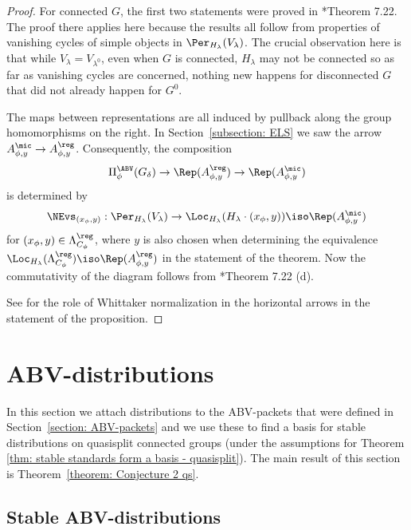 \documentclass[11pt,letterpaper]{amsart}
\numberwithin{equation}{section}
\begin{document}
\begin{proof}
    For connected $G$, the first two statements were proved in \cite{CFMMX22}*{Theorem 7.22}.
    The proof there applies here because the results all follow from properties of vanishing cycles of simple objects in $\Per_{H_\lambda}(V_\lambda)$.
    The crucial observation here is that while $V_{\lambda} = V_{\lambda^0}$, even when $G$ is connected, $H_\lambda$ may not be connected so as far as vanishing cycles are concerned, nothing new happens for disconnected $G$ that did not already happen for $G^0$. 
    
    The maps between representations are all induced by pullback along the group homomorphisms on the right. 
    In Section~\ref{subsection: ELS} we saw the arrow $A_{\phi,y}^\mic \to A_{\phi,y}^\reg$.
    Consequently, the composition 
\[
\Pi^\ABV_\phi(G_\delta) \to \Rep(A_{\phi,y}^\reg) \to \Rep(A_{\phi,y}^\mic)
\]
is determined by 
\[
\NEvs_{(x_\phi,y)} : \Per_{H_\lambda}(V_\lambda) \to \Loc_{H_\lambda}(H_\lambda\cdot (x_\phi,y)) 
\iso
\Rep(A_{\phi,y}^\mic)
\]
for $(x_\phi,y)\in \Lambda_{C_\phi}^\reg$,
where $y$ is also chosen when determining the equivalence $\Loc_{H_\lambda}(\Lambda_{C_\phi}^\reg) \iso \Rep(A_{\phi,y}^\reg)$ in the statement of the theorem.
Now the commutativity of the diagram follows from 
\cite{CFMMX22}*{Theorem 7.22 (d)}.

See \cite{CDFZ25} for the role of Whittaker normalization in the horizontal arrows in the statement of the proposition.
\end{proof}


\section{ABV-distributions}\label{section: etaABV}

In this section we attach distributions to the ABV-packets that were defined in Section~\ref{section: ABV-packets} and we use these to find a basis for stable distributions on quasisplit connected groups (under the assumptions for Theorem \ref{thm: stable standards form a basis - quasisplit}).
The main result of this section is Theorem~\ref{theorem: Conjecture 2 qs}.


\subsection{Stable ABV-distributions}\label{subsection: stable ABV-distributions}
\end{document}
